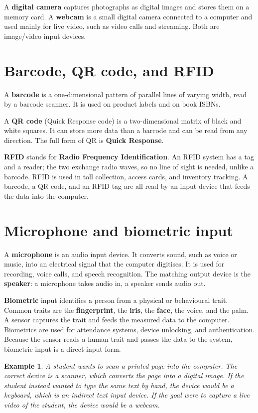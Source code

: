 \documentclass[11pt]{article}
\newtheorem{example}{Example}[section]
\begin{document}
A \textbf{digital camera} captures photographs as digital images and stores
them on a memory card. A \textbf{webcam} is a small digital camera connected
to a computer and used mainly for live video, such as video calls and
streaming. Both are image/video input devices.

\section{Barcode, QR code, and RFID}
A \textbf{barcode} is a one-dimensional pattern of parallel lines of varying
width, read by a barcode scanner. It is used on product labels and on book
ISBNs.

A \textbf{QR code} (Quick Response code) is a two-dimensional matrix of black
and white squares. It can store more data than a barcode and can be read from
any direction. The full form of QR is \textbf{Quick Response}.

\textbf{RFID} stands for \textbf{Radio Frequency Identification}. An RFID
system has a tag and a reader; the two exchange radio waves, so no line of
sight is needed, unlike a barcode. RFID is used in toll collection, access
cards, and inventory tracking. A barcode, a QR code, and an RFID tag are all
read by an input device that feeds the data into the computer.

\section{Microphone and biometric input}
A \textbf{microphone} is an audio input device. It converts sound, such as
voice or music, into an electrical signal that the computer digitises. It is
used for recording, voice calls, and speech recognition. The matching output
device is the \textbf{speaker}: a microphone takes audio in, a speaker sends
audio out.

\textbf{Biometric} input identifies a person from a physical or behavioural
trait. Common traits are the \textbf{fingerprint}, the \textbf{iris}, the
\textbf{face}, the voice, and the palm. A sensor captures the trait and feeds
the measured data to the computer. Biometrics are used for attendance
systems, device unlocking, and authentication. Because the sensor reads a
human trait and passes the data to the system, biometric input is a direct
input form.

\begin{example}
A student wants to scan a printed page into the computer. The correct device
is a scanner, which converts the page into a digital image. If the student
instead wanted to type the same text by hand, the device would be a keyboard,
which is an indirect text input device. If the goal were to capture a live
video of the student, the device would be a webcam.
\end{example}
\end{document}

